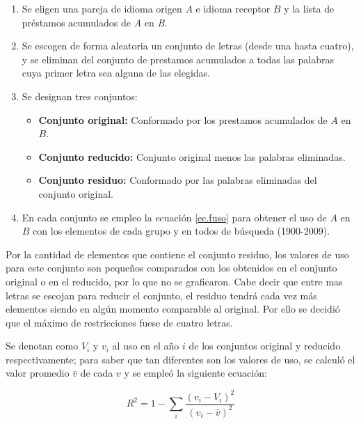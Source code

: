\begin{enumerate}
	
	\item Se eligen una pareja de idioma origen $\textit{A}$ e idioma receptor $\textit{B}$ y la lista de préstamos acumulados de \textit{A} en \textit{B}.
	
	\item Se escogen de forma aleatoria un conjunto de letras (desde una hasta cuatro), y se eliminan del conjunto de prestamos acumulados  a todas las palabras cuya primer letra sea alguna de las elegidas.  
	
	\newpage
	
	\item Se designan tres conjuntos:
	
		\begin{itemize}
			\item \textbf{Conjunto original:} Conformado por los prestamos acumulados  de $\textit{A}$  en $\textit{B}$.
			\item \textbf{Conjunto reducido:} Conjunto original menos las palabras eliminadas. 
			\item \textbf{Conjunto residuo:} Conformado por las palabras eliminadas del conjunto original. 
		\end{itemize}
	
	\item En cada conjunto se empleo la ecuación \ref{ec.fuso} para obtener el uso de $\textit{A}$ en $\textit{B}$  con los elementos de cada grupo y en todos de búsqueda (1900-2009).
	
	 
	
\end{enumerate}


Por la cantidad de elementos que contiene el conjunto residuo, los valores de uso para este conjunto son pequeños comparados con los obtenidos en el conjunto original o en el reducido, por lo que no se graficaron. Cabe decir que entre mas letras se escojan para reducir el conjunto, el residuo tendrá cada vez más elementos siendo en algún momento comparable al original.  Por ello se decidió que el máximo de restricciones fuese de cuatro letras. 

Se denotan como $V_{i}$ y $v_{i}$ al uso en el año $i$ de los conjuntos original y reducido respectivamente; para saber que tan diferentes son los valores de uso, se calculó el valor promedio $\bar{v}$ de cada $v$  y  se empleó la siguiente ecuación:

\begin{equation}
\label{ec.dif_uso}
R^{2} = 1 - \sum_{i} \frac{ \left( v_{i} - V_{i} \right)^{2}  }{ \left( v_{i} - \bar{v} \right)^{2} }
\end{equation}

